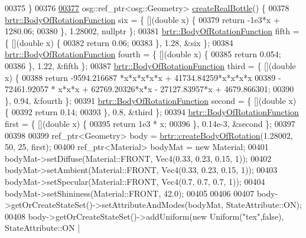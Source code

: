 \begin{DoxyCode}
00375     \}
00376 
\hypertarget{_util_functions_8cpp_source_l00377}{}\hyperlink{namespacebrtr_a614d8d6b8bcc6c4e7f7ffb24ca48eb4c}{00377}     osg::ref\_ptr<osg::Geometry> \hyperlink{namespacebrtr_a614d8d6b8bcc6c4e7f7ffb24ca48eb4c}{createRealBottle}() \{
00378         \hyperlink{structbrtr_1_1_body_of_rotation_function}{brtr::BodyOfRotationFunction} six = \{ [](\textcolor{keywordtype}{double} x) \{
00379             \textcolor{keywordflow}{return} -1e3*x + 1280.06;
00380         \}, 1.28002, \textcolor{keyword}{nullptr} \};
00381         \hyperlink{structbrtr_1_1_body_of_rotation_function}{brtr::BodyOfRotationFunction} fifth = \{ [](\textcolor{keywordtype}{double} x) \{
00382             \textcolor{keywordflow}{return} 0.06;
00383         \}, 1.28, &six \};
00384         \hyperlink{structbrtr_1_1_body_of_rotation_function}{brtr::BodyOfRotationFunction} fourth = \{ [](\textcolor{keywordtype}{double} x) \{
00385             \textcolor{keywordflow}{return} 0.054;
00386         \}, 1.22, &fifth \};
00387         \hyperlink{structbrtr_1_1_body_of_rotation_function}{brtr::BodyOfRotationFunction} third = \{ [](\textcolor{keywordtype}{double} x) \{
00388             \textcolor{keywordflow}{return} -9594.216687 *x*x*x*x*x + 41734.84259*x*x*x*x
00389                 - 72461.92057 * x*x*x + 62769.20326*x*x - 27127.83957*x + 4679.866301;
00390         \}, 0.94, &fourth \};
00391         \hyperlink{structbrtr_1_1_body_of_rotation_function}{brtr::BodyOfRotationFunction} second = \{ [](\textcolor{keywordtype}{double} x) \{
00392             \textcolor{keywordflow}{return} 0.14;
00393         \}, 0.8, &third \};
00394         \hyperlink{structbrtr_1_1_body_of_rotation_function}{brtr::BodyOfRotationFunction} first = \{ [](\textcolor{keywordtype}{double} x) \{
00395             \textcolor{keywordflow}{return} 1e3 * x;
00396         \}, 0.14e-3, &second \};
00397 
00398 
00399         ref\_ptr<Geometry> body = \hyperlink{namespacebrtr_a83d3e627c9dc247459610aa9fec23d7b}{brtr::createBodyOfRotation}(1.28002, 50, 25, 
      first);
00400         ref\_ptr<Material> bodyMat = \textcolor{keyword}{new} Material;
00401         bodyMat->setDiffuse(Material::FRONT, Vec4(0.33, 0.23, 0.15, 1));
00402         bodyMat->setAmbient(Material::FRONT, Vec4(0.33, 0.23, 0.15, 1));
00403         bodyMat->setSpecular(Material::FRONT, Vec4(0.7, 0.7, 0.7, 1));
00404         bodyMat->setShininess(Material::FRONT, 42.0);
00405 
00406         
00407         body->getOrCreateStateSet()->setAttributeAndModes(bodyMat, StateAttribute::ON);
00408         body->getOrCreateStateSet()->addUniform(\textcolor{keyword}{new} Uniform(\textcolor{stringliteral}{"tex"},\textcolor{keyword}{false}), StateAttribute::ON | 

\end{DoxyCode}
